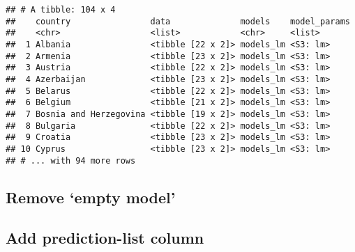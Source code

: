 \documentclass[]{article}
\newenvironment{Shaded}{\begin{snugshade}}{\end{snugshade}}
\newcommand{\KeywordTok}[1]{\textcolor[rgb]{0.13,0.29,0.53}{\textbf{#1}}}
\newcommand{\DataTypeTok}[1]{\textcolor[rgb]{0.13,0.29,0.53}{#1}}
\newcommand{\StringTok}[1]{\textcolor[rgb]{0.31,0.60,0.02}{#1}}
\newcommand{\CommentTok}[1]{\textcolor[rgb]{0.56,0.35,0.01}{\textit{#1}}}
\newcommand{\OperatorTok}[1]{\textcolor[rgb]{0.81,0.36,0.00}{\textbf{#1}}}
\newcommand{\NormalTok}[1]{#1}
\begin{document}
\begin{verbatim}
## # A tibble: 104 x 4
##    country                data              models    model_params
##    <chr>                  <list>            <chr>     <list>      
##  1 Albania                <tibble [22 x 2]> models_lm <S3: lm>    
##  2 Armenia                <tibble [23 x 2]> models_lm <S3: lm>    
##  3 Austria                <tibble [22 x 2]> models_lm <S3: lm>    
##  4 Azerbaijan             <tibble [23 x 2]> models_lm <S3: lm>    
##  5 Belarus                <tibble [22 x 2]> models_lm <S3: lm>    
##  6 Belgium                <tibble [21 x 2]> models_lm <S3: lm>    
##  7 Bosnia and Herzegovina <tibble [19 x 2]> models_lm <S3: lm>    
##  8 Bulgaria               <tibble [22 x 2]> models_lm <S3: lm>    
##  9 Croatia                <tibble [23 x 2]> models_lm <S3: lm>    
## 10 Cyprus                 <tibble [23 x 2]> models_lm <S3: lm>    
## # ... with 94 more rows
\end{verbatim}

\subsection{\texorpdfstring{Remove `empty
model'}{Remove empty model}}\label{remove-empty-model}

\begin{Shaded}
\end{Shaded}

\subsection{Add prediction-list
column}\label{add-prediction-list-column}

\begin{Shaded}
\end{Shaded}
\end{document}

